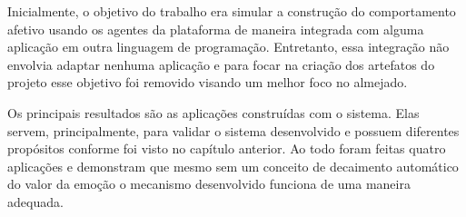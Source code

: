 Inicialmente, o objetivo do trabalho era simular a construção do comportamento
afetivo usando os agentes da plataforma \jason de maneira integrada com alguma
aplicação em outra linguagem de programação. Entretanto, essa integração não
envolvia adaptar nenhuma aplicação e para focar na criação dos artefatos do
projeto esse objetivo foi removido visando um melhor foco no almejado.

Os principais resultados são as aplicações construídas com o sistema. Elas
servem, principalmente, para validar o sistema desenvolvido e possuem
diferentes propósitos conforme foi visto no capítulo anterior. Ao todo foram
feitas quatro aplicações e demonstram que mesmo sem um conceito de decaimento
automático do valor da emoção o mecanismo desenvolvido funciona de uma maneira
adequada.

